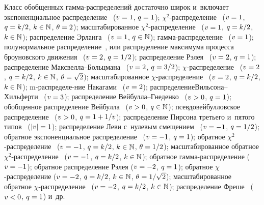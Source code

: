 \begin{multicols}{2}
Класс обобщенных гам\-ма-рас\-пре\-де\-ле\-ний до\-ста\-точно широк и~включает
экспоненциальное распре\-де\-ле\-ние~\cite{KoPoSkTu1985} ($v\hm=1$, $q\hm=1$);
$\chi^2$-рас\-пре\-де\-ле\-ние~\cite{KoPoSkTu1985} ($v\hm=1$, $q\hm=k/2$, 
$k\hm\in\mathbb{N}$,  $\theta\hm=2$);
масштабированное $\chi^2$-рас\-пре\-де\-ле\-ние~\cite{Lee2012} ($v\hm=1$, $q\hm=k/2$, 
$k\hm\in\mathbb{N}$);
распределение Эрланга~\cite{KoPoSkTu1985} ($v\hm=1$, $q\hm\in\mathbb{N}$);
гамма-распределение~\cite{KoPoSkTu1985} ($v\hm=1$);
полунормальное распределение~\cite{KlKo2003}, или
распределение максимума процесса броуновского движения~\cite{Kruglov2016} 
($v\hm=2$, $q\hm=1/2$);
распределение Рэлея~\cite{KoPoSkTu1985} ($v\hm=2$, $q\hm=1$);
распределение Макс\-вел\-ла--Больц\-ма\-на~\cite{KoPoSkTu1985} ($v\hm=2$, $q\hm=3/2$);
$\chi$-рас\-пре\-де\-ле\-ние~\cite{KoPoSkTu1985} ($v\hm=2$, $q\hm=k/2$, $k\hm\in\mathbb{N}$, 
$\theta\hm=\sqrt{2}$);
масштабированное $\chi$-рас\-пре\-де\-ление~\cite{Gelman2014} ($v\hm=2$, $q\hm=k/2$, 
$k\hm\in\mathbb{N}$);
m-распределе-\linebreak ние Накагами~\cite{Nakagami} ($v\hm=2$);
распределение\linebreak Виль\-со\-на--Хиль\-фер\-ти~\cite{WiHi1931} ($v\hm=3$);
распределение Вей\-бул\-ла--Гне\-ден\-ко~\cite{KoPoSkTu1985} ($v\hm>0$, $q\hm=1$);
обобщенное распределение Вейбулла~\cite{Lai2014} ($v\hm>0$, $q\hm\in\mathbb{N}$);
псевдовейбулловское распределение~\cite{Voda1989} ($v\hm>0$, $q\hm=1\hm+1/v$);
распределение Пирсона третьего и~пятого типов~\cite{KoPoSkTu1985} ($|v|\hm=1$);
распределение Леви с~нулевым смещением~\cite{KoPoSkTu1985} ($v\hm=-1$, $q\hm=1/2$);
обратное экспоненциальное распределение~\cite{KlKo2003} ($v\hm=-1$, $q\hm=1$);
обратное $\chi^2$-рас\-пре\-де\-ле\-ние~\cite{Gelman2014} ($v\hm=-1$, $q\hm=k/2$, 
$k\hm\in\mathbb{N}$, $\theta\hm=1/{2}$);
масштабированное обратное $\chi^2$-рас\-пре\-де\-ле\-ние~\cite{Gelman2014} ($v\hm=-1$, 
$q\hm=k/2$, $k\hm\in\mathbb{N}$);
обратное гам\-ма-рас\-пре\-де\-ле\-ние \cite{Gelman2014} ($v\hm=-1$);
обратное распределение Рэлея \cite{Panwar2015} ($v\hm=-2$, $q\hm=1$);
обратное $\chi$-рас\-пре\-де\-ле\-ние \cite{Lee2012} ($v\hm=-2$, $q\hm=k/2$, $k\hm\in\mathbb{N}$, 
$\theta\hm=1/\sqrt{2}$);
масштабированное обратное $\chi$-рас\-пре\-де\-ле\-ние~\cite{Lee2012} ($v\hm=-2$, $q\hm=k/2$, 
$k\hm\in\mathbb{N}$);
распределение Фреше~\cite{Frechet1927} ($v\hm<0$, $q\hm=1$) и~др.



\end{multicols}

